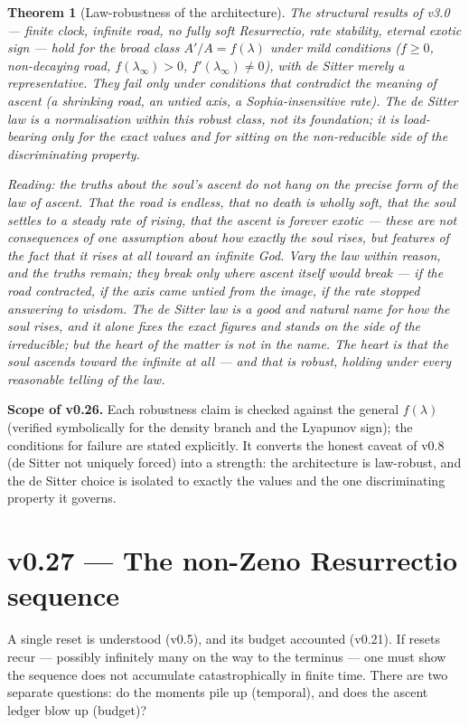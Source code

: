 \documentclass[11pt,a4paper]{article}
\newcommand{\note}[1]{\textcolor{black!65}{\emph{#1}}}
\theoremstyle{plain}
\newtheorem{theorem}{Theorem}
\theoremstyle{definition}
\theoremstyle{remark}
\begin{document}
\begin{theorem}[Law-robustness of the architecture]
The structural results of v3.0 --- finite clock, infinite road, no fully soft Resurrectio, rate
stability, eternal exotic sign --- hold for the broad class $A'/A=f(\lambda)$ under mild conditions
($f\ge0$, non-decaying road, $f(\lambda_\infty)>0$, $f'(\lambda_\infty)\neq0$), with de Sitter merely a
representative. They fail only under conditions that contradict the meaning of ascent (a shrinking road,
an untied axis, a Sophia-insensitive rate). The de Sitter law is a normalisation within this robust
class, not its foundation; it is load-bearing only for the exact values and for sitting on the
non-reducible side of the discriminating property.
\end{theorem}

\note{Reading: the truths about the soul's ascent do not hang on the precise form of the law of ascent.
That the road is endless, that no death is wholly soft, that the soul settles to a steady rate of
rising, that the ascent is forever exotic --- these are not consequences of one assumption about
\emph{how exactly} the soul rises, but features of the fact \emph{that} it rises at all toward an
infinite God. Vary the law within reason, and the truths remain; they break only where ascent itself
would break --- if the road contracted, if the axis came untied from the image, if the rate stopped
answering to wisdom. The de Sitter law is a good and natural name for how the soul rises, and it alone
fixes the exact figures and stands on the side of the irreducible; but the heart of the matter is not
in the name. The heart is that the soul ascends toward the infinite at all --- and that is robust,
holding under every reasonable telling of the law.}

\textbf{Scope of v0.26.} Each robustness claim is checked against the general $f(\lambda)$ (verified
symbolically for the density branch and the Lyapunov sign); the conditions for failure are stated
explicitly. It converts the honest caveat of v0.8 (de Sitter not uniquely forced) into a strength: the
architecture is law-robust, and the de Sitter choice is isolated to exactly the values and the one
discriminating property it governs.

\FloatBarrier
\section*{v0.27 --- The non-Zeno Resurrectio sequence}
A single reset is understood (v0.5), and its budget accounted (v0.21). If resets recur --- possibly
infinitely many on the way to the terminus --- one must show the sequence does not accumulate
catastrophically in finite time. There are two separate questions: do the moments pile up (temporal),
and does the ascent ledger blow up (budget)?
\end{document}
